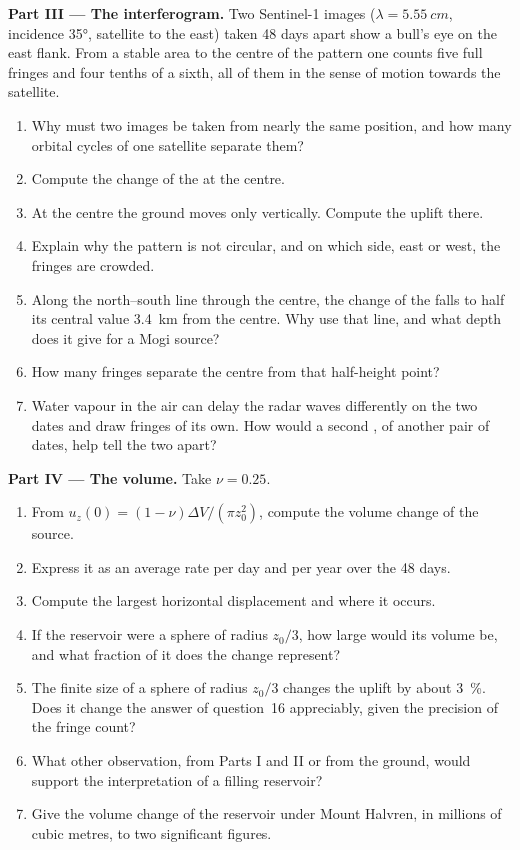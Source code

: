 \begin{problem}
\medskip\noindent\textbf{Part III --- The interferogram.} Two Sentinel-1
images ($\lambda = \qty{5.55}{cm}$, incidence \ang{35}, satellite to the
east) taken 48 days apart show a bull's eye on the east flank. From a
stable area to the centre of the pattern one counts five full fringes and
four tenths of a sixth, all of them in the sense of motion towards the
satellite.
\begin{enumerate}[resume]
\item Why must two images be taken from nearly the same position, and how
  many orbital cycles of one satellite separate them?
\item Compute the change of the  at the centre.
\item At the centre the ground moves only vertically. Compute the uplift
  there.
\item Explain why the pattern is not circular, and on which side, east or
  west, the fringes are crowded.
\item Along the north--south line through the centre, the change of the
   falls to half its central value \qty{3.4}{km} from the
  centre. Why use that line, and what depth does it give for a Mogi
  source?
\item How many fringes separate the centre from that half-height point?
\item Water vapour in the air can delay the radar waves differently on the
  two dates and draw fringes of its own. How would a second ,
  of another pair of dates, help tell the two apart?
\end{enumerate}

\medskip\noindent\textbf{Part IV --- The volume.} Take $\nu = 0.25$.
\begin{enumerate}[resume]
\item From $u_z(0) = (1 - \nu)\Delta V/(\pi z_0^2)$, compute the volume
  change of the source.
\item Express it as an average rate per day and per year over the 48 days.
\item Compute the largest horizontal displacement and where it occurs.
\item If the reservoir were a sphere of radius $z_0/3$, how large would its
  volume be, and what fraction of it does the change represent?
\item The finite size of a sphere of radius $z_0/3$ changes the uplift by
  about \qty{3}{\percent}. Does it change the answer of question~16
  appreciably, given the precision of the fringe count?
\item What other observation, from Parts I and II or from the ground,
  would support the interpretation of a filling reservoir?
\item Give the volume change of the reservoir under Mount Halvren, in
  millions of cubic metres, to two significant figures.
\end{enumerate}
\end{problem}
